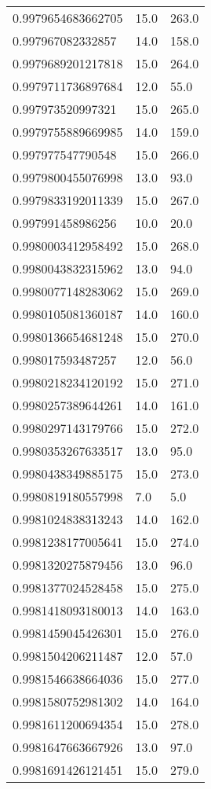 \begin{center}
\begin{supertabular}[H]{p{0.30\textwidth}p{0.05\textwidth}p{0.05\textwidth}}
0.9979654683662705 & 15.0 & 263.0 \\ 
0.997967082332857 & 14.0 & 158.0 \\ 
0.9979689201217818 & 15.0 & 264.0 \\ 
0.9979711736897684 & 12.0 & 55.0 \\ 
0.997973520997321 & 15.0 & 265.0 \\ 
0.9979755889669985 & 14.0 & 159.0 \\ 
0.997977547790548 & 15.0 & 266.0 \\ 
0.9979800455076998 & 13.0 & 93.0 \\ 
0.9979833192011339 & 15.0 & 267.0 \\ 
0.997991458986256 & 10.0 & 20.0 \\ 
0.9980003412958492 & 15.0 & 268.0 \\ 
0.9980043832315962 & 13.0 & 94.0 \\ 
0.9980077148283062 & 15.0 & 269.0 \\ 
0.9980105081360187 & 14.0 & 160.0 \\ 
0.9980136654681248 & 15.0 & 270.0 \\ 
0.998017593487257 & 12.0 & 56.0 \\ 
0.9980218234120192 & 15.0 & 271.0 \\ 
0.9980257389644261 & 14.0 & 161.0 \\ 
0.9980297143179766 & 15.0 & 272.0 \\ 
0.9980353267633517 & 13.0 & 95.0 \\ 
0.9980438349885175 & 15.0 & 273.0 \\ 
0.9980819180557998 & 7.0 & 5.0 \\ 
0.9981024838313243 & 14.0 & 162.0 \\ 
0.9981238177005641 & 15.0 & 274.0 \\ 
0.9981320275879456 & 13.0 & 96.0 \\ 
0.9981377024528458 & 15.0 & 275.0 \\ 
0.9981418093180013 & 14.0 & 163.0 \\ 
0.9981459045426301 & 15.0 & 276.0 \\ 
0.9981504206211487 & 12.0 & 57.0 \\ 
0.9981546638664036 & 15.0 & 277.0 \\ 
0.9981580752981302 & 14.0 & 164.0 \\ 
0.9981611200694354 & 15.0 & 278.0 \\ 
0.9981647663667926 & 13.0 & 97.0 \\ 
0.9981691426121451 & 15.0 & 279.0 \\ 

\end{supertabular}
\end{center}
